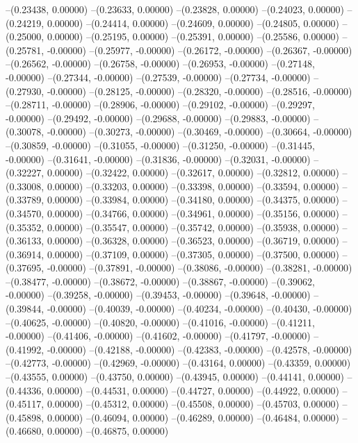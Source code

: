 --(0.23438, 0.00000)
--(0.23633, 0.00000)
--(0.23828, 0.00000)
--(0.24023, 0.00000)
--(0.24219, 0.00000)
--(0.24414, 0.00000)
--(0.24609, 0.00000)
--(0.24805, 0.00000)
--(0.25000, 0.00000)
--(0.25195, 0.00000)
--(0.25391, 0.00000)
--(0.25586, 0.00000)
--(0.25781, -0.00000)
--(0.25977, -0.00000)
--(0.26172, -0.00000)
--(0.26367, -0.00000)
--(0.26562, -0.00000)
--(0.26758, -0.00000)
--(0.26953, -0.00000)
--(0.27148, -0.00000)
--(0.27344, -0.00000)
--(0.27539, -0.00000)
--(0.27734, -0.00000)
--(0.27930, -0.00000)
--(0.28125, -0.00000)
--(0.28320, -0.00000)
--(0.28516, -0.00000)
--(0.28711, -0.00000)
--(0.28906, -0.00000)
--(0.29102, -0.00000)
--(0.29297, -0.00000)
--(0.29492, -0.00000)
--(0.29688, -0.00000)
--(0.29883, -0.00000)
--(0.30078, -0.00000)
--(0.30273, -0.00000)
--(0.30469, -0.00000)
--(0.30664, -0.00000)
--(0.30859, -0.00000)
--(0.31055, -0.00000)
--(0.31250, -0.00000)
--(0.31445, -0.00000)
--(0.31641, -0.00000)
--(0.31836, -0.00000)
--(0.32031, -0.00000)
--(0.32227, 0.00000)
--(0.32422, 0.00000)
--(0.32617, 0.00000)
--(0.32812, 0.00000)
--(0.33008, 0.00000)
--(0.33203, 0.00000)
--(0.33398, 0.00000)
--(0.33594, 0.00000)
--(0.33789, 0.00000)
--(0.33984, 0.00000)
--(0.34180, 0.00000)
--(0.34375, 0.00000)
--(0.34570, 0.00000)
--(0.34766, 0.00000)
--(0.34961, 0.00000)
--(0.35156, 0.00000)
--(0.35352, 0.00000)
--(0.35547, 0.00000)
--(0.35742, 0.00000)
--(0.35938, 0.00000)
--(0.36133, 0.00000)
--(0.36328, 0.00000)
--(0.36523, 0.00000)
--(0.36719, 0.00000)
--(0.36914, 0.00000)
--(0.37109, 0.00000)
--(0.37305, 0.00000)
--(0.37500, 0.00000)
--(0.37695, -0.00000)
--(0.37891, -0.00000)
--(0.38086, -0.00000)
--(0.38281, -0.00000)
--(0.38477, -0.00000)
--(0.38672, -0.00000)
--(0.38867, -0.00000)
--(0.39062, -0.00000)
--(0.39258, -0.00000)
--(0.39453, -0.00000)
--(0.39648, -0.00000)
--(0.39844, -0.00000)
--(0.40039, -0.00000)
--(0.40234, -0.00000)
--(0.40430, -0.00000)
--(0.40625, -0.00000)
--(0.40820, -0.00000)
--(0.41016, -0.00000)
--(0.41211, -0.00000)
--(0.41406, -0.00000)
--(0.41602, -0.00000)
--(0.41797, -0.00000)
--(0.41992, -0.00000)
--(0.42188, -0.00000)
--(0.42383, -0.00000)
--(0.42578, -0.00000)
--(0.42773, -0.00000)
--(0.42969, -0.00000)
--(0.43164, 0.00000)
--(0.43359, 0.00000)
--(0.43555, 0.00000)
--(0.43750, 0.00000)
--(0.43945, 0.00000)
--(0.44141, 0.00000)
--(0.44336, 0.00000)
--(0.44531, 0.00000)
--(0.44727, 0.00000)
--(0.44922, 0.00000)
--(0.45117, 0.00000)
--(0.45312, 0.00000)
--(0.45508, 0.00000)
--(0.45703, 0.00000)
--(0.45898, 0.00000)
--(0.46094, 0.00000)
--(0.46289, 0.00000)
--(0.46484, 0.00000)
--(0.46680, 0.00000)
--(0.46875, 0.00000)

